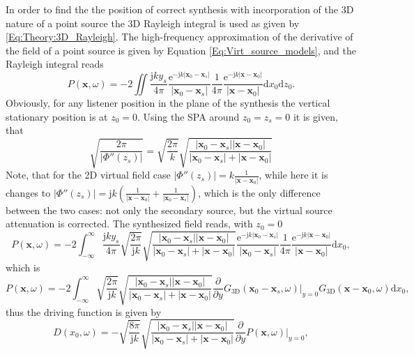 \documentclass[12pt,a4paper]{article}
\newcommand{\td}{\mathrm{d}}
\newcommand{\te}{\mathrm{e}}
\newcommand{\ti}{\mathrm{j}}
\newcommand{\vx}{\mathbf{x}}
\newcommand{\vxo}{\mathbf{x}_0}
\begin{document}
In order to find the the position of correct synthesis with incorporation of the 3D nature of a point source the 3D Rayleigh integral is used as given by \eqref{Eq:Theory:3D_Rayleigh}. The high-frequency approximation of the derivative of the field of a point source is given by Equation \eqref{Eq:Virt_source_models}, and the Rayleigh integral reads
\begin{equation}
P(\vx,\omega) = -2 \iint \frac{\ti k y_s}{4\pi} \frac{\te^{-\ti k | \vxo - \mathbf{x}_s | }}{|\vxo - \mathbf{x}_s|} \frac{1}{4\pi} \frac{\te^{-\ti k | \vx - \vxo| }}{ | \vx - \vxo| } \td x_0 \td z_0.
\end{equation}
Obviously, for any listener position in the plane of the synthesis the vertical stationary position is at $z_0=0$. Using the SPA around $z_0 = z_s = 0$ it is given, that
\begin{equation}
\sqrt{\frac{2\pi}{|\Phi''(z_s)|}} = \sqrt{\frac{2\pi}{ k }}\sqrt{\frac{| \vxo - \mathbf{x}_s | | \vx - \vxo|  }{| \vxo - \mathbf{x}_s | + | \vx - \vxo| }}
\end{equation}
Note, that for the 2D virtual field case $|\Phi''(z_s)| = k \frac{1}{ |\vx - \vxo| }$, while here it is changes to $|\Phi''(z_s)| = \ti k \left( \frac{1}{| \vx - \vxo|} + \frac{1}{ |\vxo - \mathbf{x}_s |} \right)$, which is the only difference between the two cases: not only the secondary source, but the virtual source attenuation is corrected.
The synthesized field reads, with $z_0=0$
\begin{equation}
P(\vx,\omega) = -2 \int_{-\infty}^{\infty} \frac{\ti k y_s}{4\pi} \sqrt{\frac{2\pi}{\ti k}}\sqrt{\frac{| \vxo - \mathbf{x}_s | | \vx - \vxo|  }{| \vxo - \mathbf{x}_s | + | \vx - \vxo| }} \frac{\te^{-\ti k | \vxo - \mathbf{x}_s | }}{|\vxo - \mathbf{x}_s|} \frac{1}{4\pi} \frac{\te^{-\ti k | \vx - \vxo| }}{ | \vx - \vxo| } \td x_0,
\end{equation}
which is
\begin{equation}
P(\vx,\omega) = -2 \int_{-\infty}^{\infty}  \sqrt{\frac{2\pi}{\ti k}}\sqrt{\frac{| \vxo - \mathbf{x}_s | | \vx - \vxo|  }{| \vxo - \mathbf{x}_s | + | \vx - \vxo| }} \frac{\partial}{\partial y} \left. G_{3\mathrm{D}}(\vxo - \mathbf{x}_s,\omega) \right|_{y = 0}   G_{3\mathrm{D}}(\vx - \vxo,\omega) \td x_0,
\end{equation}
thus the driving function is given by
\begin{equation}
D(x_0,\omega) = 
- \sqrt{\frac{8\pi}{\ti k}} \sqrt{\frac{| \vxo - \mathbf{x}_s | | \vx - \vxo|  }{| \vxo - \mathbf{x}_s | + | \vx - \vxo| }} \frac{\partial}{\partial y} \left. P(\vx,\omega) \right|_{y = 0},
\end{equation}
\end{document}
